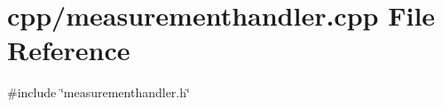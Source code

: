 \section{cpp/measurementhandler.cpp File Reference}
\label{measurementhandler_8cpp}
{\ttfamily \#include \char`\"{}measurementhandler.\+h\char`\"{}}\newline
